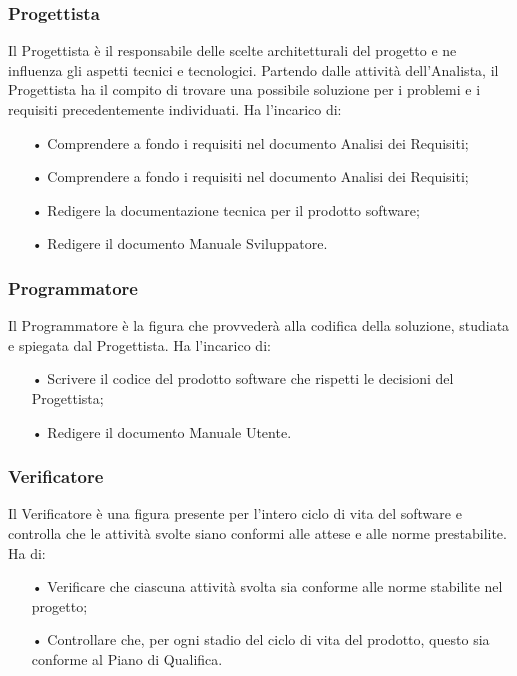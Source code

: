 \subsubsection{Progettista}
Il Progettista è il responsabile delle scelte architetturali del progetto e ne influenza gli aspetti tecnici e tecnologici.  
\newline
Partendo dalle attività dell'Analista, il Progettista ha il compito di trovare una possibile soluzione per i problemi e i requisiti precedentemente individuati. 
\newline
Ha l’incarico di:
\begin{itemize}
\item[•] Comprendere a fondo i requisiti nel documento Analisi dei Requisiti;
\item[•] Comprendere a fondo i requisiti nel documento Analisi dei Requisiti;
\item[•] Redigere la documentazione tecnica per il prodotto software;
\item[•] Redigere il documento Manuale Sviluppatore.
\end{itemize}

\subsubsection{Programmatore}
Il Programmatore è la figura che provvederà alla codifica della soluzione, studiata e spiegata dal Progettista.  
\newline
Ha l'incarico di:
\begin{itemize}
\item[•] Scrivere il codice del prodotto software che rispetti le decisioni del Progettista;
\item[•] Redigere il documento Manuale Utente.
\end{itemize}

\subsubsection{Verificatore}
Il Verificatore è una figura presente per l'intero ciclo di vita del software e controlla che le attività svolte siano conformi alle attese e alle norme prestabilite.  
\newline
Ha  di:
\begin{itemize}
\item[•] Verificare che ciascuna attività svolta sia conforme alle norme stabilite nel progetto;
\item[•] Controllare che, per ogni stadio del ciclo di vita del prodotto, questo sia conforme al Piano di Qualifica.
\end{itemize}


